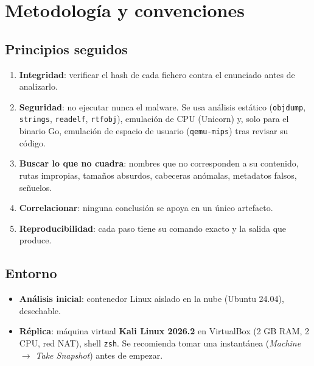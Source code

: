 \documentclass[11pt,a4paper]{article}
\begin{document}
\clearpage
\tableofcontents
\clearpage


\section{Metodología y convenciones}

\subsection{Principios seguidos}
\begin{enumerate}
  \item \textbf{Integridad}: verificar el hash de cada fichero contra el enunciado antes de analizarlo.
  \item \textbf{Seguridad}: no ejecutar nunca el malware. Se usa análisis estático (\texttt{objdump}, \texttt{strings},
        \texttt{readelf}, \texttt{rtfobj}), emulación de CPU (Unicorn) y, solo para el binario Go, emulación de
        espacio de usuario (\texttt{qemu-mips}) tras revisar su código.
  \item \textbf{Buscar lo que no cuadra}: nombres que no corresponden a su contenido, rutas impropias, tamaños absurdos,
        cabeceras anómalas, metadatos falsos, señuelos.
  \item \textbf{Correlacionar}: ninguna conclusión se apoya en un único artefacto.
  \item \textbf{Reproducibilidad}: cada paso tiene su comando exacto y la salida que produce.
\end{enumerate}

\subsection{Entorno}
\begin{itemize}
  \item \textbf{Análisis inicial}: contenedor Linux aislado en la nube (Ubuntu 24.04), desechable.
  \item \textbf{Réplica}: máquina virtual \textbf{Kali Linux 2026.2} en VirtualBox (2 GB RAM, 2 CPU, red NAT), shell
        \texttt{zsh}. Se recomienda tomar una instantánea (\emph{Machine $\to$ Take Snapshot}) antes de empezar.
\end{itemize}
\end{document}

